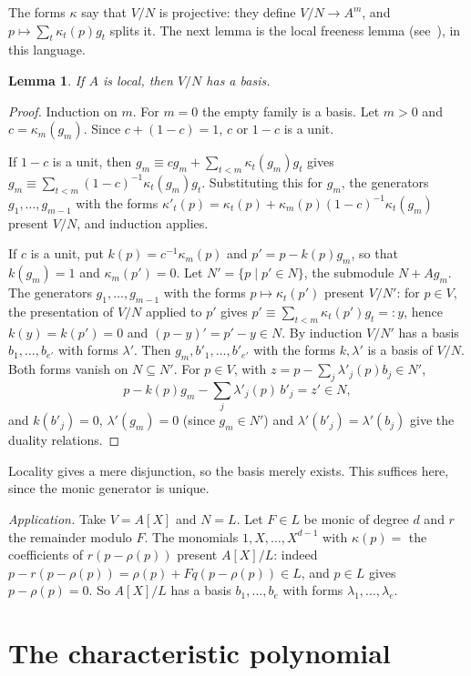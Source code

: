 \documentclass[11pt]{amsart}
\newtheorem{lemma}[theorem]{Lemma}
\theoremstyle{remark}
\begin{document}
The forms $\kappa$ say that $V/N$ is projective: they define $V/N\to A^m$,
and $p\mapsto\sum_t\kappa_t(p)g_t$ splits it. The next lemma is the local
freeness lemma (see~\cite{LQ}), in this language.

\begin{lemma}\label{lem:free}
If $A$ is local, then $V/N$ has a basis.
\end{lemma}

\begin{proof}
Induction on $m$. For $m=0$ the empty family is a basis. Let $m>0$ and
$c=\kappa_m(g_m)$. Since $c+(1-c)=1$, $c$ or $1-c$ is a unit.

If $1-c$ is a unit, then $g_m\equiv cg_m+\sum_{t<m}\kappa_t(g_m)g_t$ gives
$g_m\equiv\sum_{t<m}(1-c)^{-1}\kappa_t(g_m)g_t$. Substituting this for $g_m$,
the generators $g_1,\dots,g_{m-1}$ with the forms
$\kappa'_t(p)=\kappa_t(p)+\kappa_m(p)(1-c)^{-1}\kappa_t(g_m)$ present $V/N$,
and induction applies.

If $c$ is a unit, put $k(p)=c^{-1}\kappa_m(p)$ and $p'=p-k(p)g_m$, so that
$k(g_m)=1$ and $\kappa_m(p')=0$. Let $N'=\{p\mid p'\in N\}$, the submodule
$N+Ag_m$. The generators $g_1,\dots,g_{m-1}$ with the forms
$p\mapsto\kappa_t(p')$ present $V/N'$: for $p\in V$, the presentation of
$V/N$ applied to $p'$ gives $p'\equiv\sum_{t<m}\kappa_t(p')g_t=:y$, hence
$k(y)=k(p')=0$ and $(p-y)'=p'-y\in N$. By induction $V/N'$ has a basis
$b_1,\dots,b_{e'}$ with forms $\lambda'$. Then $g_m,b'_1,\dots,b'_{e'}$ with
the forms $k,\lambda'$ is a basis of $V/N$. Both forms vanish on
$N\subseteq N'$. For $p\in V$, with
$z=p-\sum_j\lambda'_j(p)b_j\in N'$,
\[
p-k(p)g_m-\textstyle\sum_j\lambda'_j(p)\,b'_j=z'\in N,
\]
and $k(b'_j)=0$, $\lambda'(g_m)=0$ (since $g_m\in N'$) and
$\lambda'(b'_j)=\lambda'(b_j)$ give the duality relations.
\end{proof}

Locality gives a mere disjunction, so the basis merely exists. This suffices
here, since the monic generator is unique.

\emph{Application.} Take $V=A[X]$ and $N=L$. Let $F\in L$ be monic of degree
$d$ and $r$ the remainder modulo $F$. The monomials $1,X,\dots,X^{d-1}$ with
$\kappa(p)=$ the coefficients of $r(p-\rho(p))$ present $A[X]/L$: indeed
$p-r(p-\rho(p))=\rho(p)+Fq(p-\rho(p))\in L$, and $p\in L$ gives
$p-\rho(p)=0$. So $A[X]/L$ has a basis $b_1,\dots,b_e$ with forms
$\lambda_1,\dots,\lambda_e$.

\section{The characteristic polynomial}\label{sec:cayley}
\end{document}
